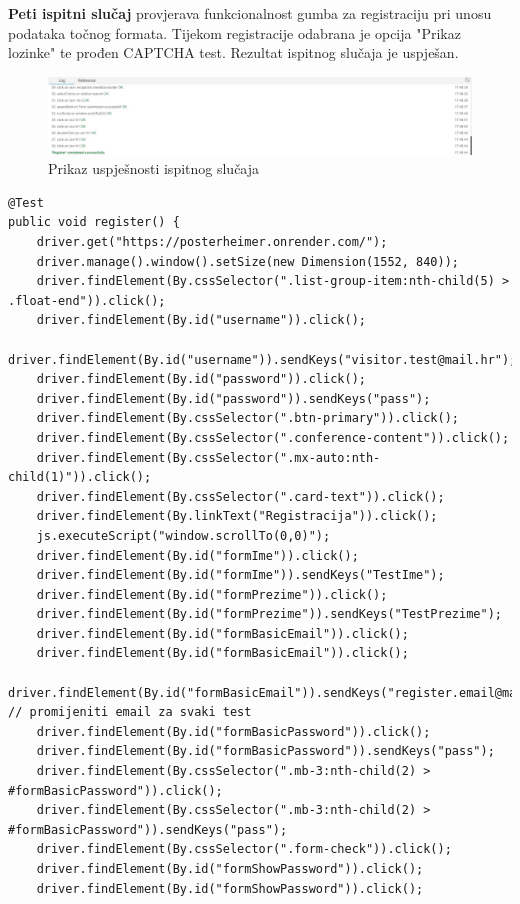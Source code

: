 			
\textbf{Peti ispitni slučaj} provjerava funkcionalnost gumba za registraciju pri unosu podataka točnog formata. Tijekom registracije odabrana je opcija "Prikaz lozinke" te prođen CAPTCHA test. Rezultat ispitnog slučaja je uspješan.

			\begin{figure} [hbt!]
	\includegraphics[width=\linewidth]{Slike/Register}
	\caption{Prikaz uspješnosti ispitnog slučaja}
			\end{figure}
			
			\begin{lstlisting}
@Test
public void register() {
	driver.get("https://posterheimer.onrender.com/");
	driver.manage().window().setSize(new Dimension(1552, 840));
	driver.findElement(By.cssSelector(".list-group-item:nth-child(5) > .float-end")).click();
	driver.findElement(By.id("username")).click();
	driver.findElement(By.id("username")).sendKeys("visitor.test@mail.hr");
	driver.findElement(By.id("password")).click();
	driver.findElement(By.id("password")).sendKeys("pass");
	driver.findElement(By.cssSelector(".btn-primary")).click();
	driver.findElement(By.cssSelector(".conference-content")).click();
	driver.findElement(By.cssSelector(".mx-auto:nth-child(1)")).click();
	driver.findElement(By.cssSelector(".card-text")).click();
	driver.findElement(By.linkText("Registracija")).click();
	js.executeScript("window.scrollTo(0,0)");
	driver.findElement(By.id("formIme")).click();
	driver.findElement(By.id("formIme")).sendKeys("TestIme");
	driver.findElement(By.id("formPrezime")).click();
	driver.findElement(By.id("formPrezime")).sendKeys("TestPrezime");
	driver.findElement(By.id("formBasicEmail")).click();
	driver.findElement(By.id("formBasicEmail")).click();
	driver.findElement(By.id("formBasicEmail")).sendKeys("register.email@mail.hr"); // promijeniti email za svaki test
	driver.findElement(By.id("formBasicPassword")).click();
	driver.findElement(By.id("formBasicPassword")).sendKeys("pass");
	driver.findElement(By.cssSelector(".mb-3:nth-child(2) > #formBasicPassword")).click();
	driver.findElement(By.cssSelector(".mb-3:nth-child(2) > #formBasicPassword")).sendKeys("pass");
	driver.findElement(By.cssSelector(".form-check")).click();
	driver.findElement(By.id("formShowPassword")).click();
	driver.findElement(By.id("formShowPassword")).click();

\end{lstlisting}
